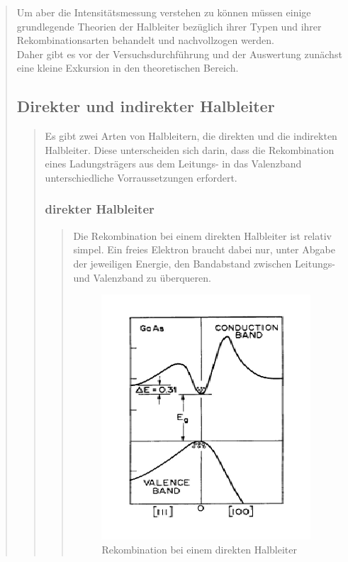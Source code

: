 \begin{quote}
    Um aber die Intensitätsmessung verstehen zu können müssen einige
    grundlegende Theorien der Halbleiter bezüglich ihrer Typen und ihrer
    Rekombinationsarten behandelt und nachvollzogen werden.\\ 
    Daher gibt es vor der Versuchsdurchführung und der Auswertung zunächst eine
    kleine Exkursion in den theoretischen Bereich.
    
        \subsection{Direkter und indirekter Halbleiter }
        \begin{quote}
        
        Es gibt zwei Arten von Halbleitern, die direkten und die indirekten
        Halbleiter. Diese unterscheiden sich darin, dass die Rekombination eines
        Ladungsträgers aus dem Leitungs- in das Valenzband unterschiedliche
        Vorraussetzungen erfordert.
            
            \subsubsection{direkter Halbleiter}
            \begin{quote}
            Die Rekombination bei einem direkten Halbleiter ist relativ simpel.
            Ein freies Elektron braucht dabei nur, unter Abgabe der jeweiligen
            Energie, den Bandabstand zwischen Leitungs- und Valenzband zu
            überqueren.
            
            \begin{figure}[H]
                    \centering
                        \includegraphics[scale=0.72, trim = 1cm 0cm 1.5cm 0cm,
                        clip]{./Emissionsbilder/restliches/direkt.png}
                        \caption{Rekombination bei einem direkten Halbleiter}
                            \label{fig:./Emissionsbilder/restliches/direkt.png}
            \end{figure}
            

\end{quote}
\end{quote}
\end{quote}

